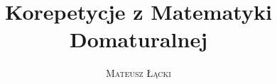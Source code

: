 \documentclass[11pt,twoside,a4paper]{book}
\begin{document}

\title{Korepetycje z Matematyki Domaturalnej}
\author{\textsc{Mateusz Łącki}}
\maketitle
\tableofcontents


	
	
	
	
	
	
	
		
		
	
\end{document}
